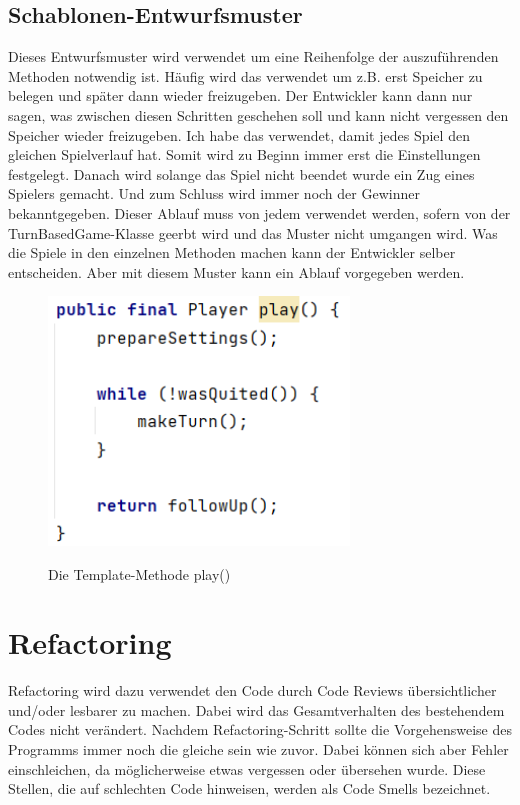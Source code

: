 \documentclass[12pt]{article}
\begin{document}
\subsection{Schablonen-Entwurfsmuster}
Dieses Entwurfsmuster wird verwendet um eine Reihenfolge der auszuführenden Methoden notwendig ist. Häufig wird das verwendet um z.B. erst Speicher zu belegen und später dann wieder freizugeben. Der Entwickler kann dann nur sagen, was zwischen diesen Schritten geschehen soll und kann nicht vergessen den Speicher wieder freizugeben. 
Ich habe das verwendet, damit jedes Spiel den gleichen Spielverlauf hat. Somit wird zu Beginn immer erst die Einstellungen festgelegt. Danach wird solange das Spiel nicht beendet wurde ein Zug eines Spielers gemacht. Und zum Schluss wird immer noch der Gewinner bekanntgegeben. Dieser Ablauf muss von jedem verwendet werden, sofern von der TurnBasedGame-Klasse geerbt wird und das Muster nicht umgangen wird. Was die Spiele in den einzelnen Methoden machen kann der Entwickler selber entscheiden. Aber mit diesem Muster kann ein Ablauf vorgegeben werden.

\begin{figure}[H]
\centering
{\includegraphics[width=8cm]{Bilder/templatePattern}}
\caption{Die Template-Methode play()}
\label{fig:templatePattern}
\end{figure}




\newpage
\section{Refactoring}
Refactoring wird dazu verwendet den Code durch Code Reviews übersichtlicher und/oder lesbarer zu machen. Dabei wird das Gesamtverhalten des bestehendem Codes nicht verändert. Nachdem Refactoring-Schritt sollte die Vorgehensweise des Programms immer noch die gleiche sein wie zuvor. Dabei können sich aber Fehler einschleichen, da möglicherweise etwas vergessen oder übersehen wurde.
Diese Stellen, die auf \glqq schlechten \grqq Code hinweisen, werden als Code Smells bezeichnet.
\end{document}
